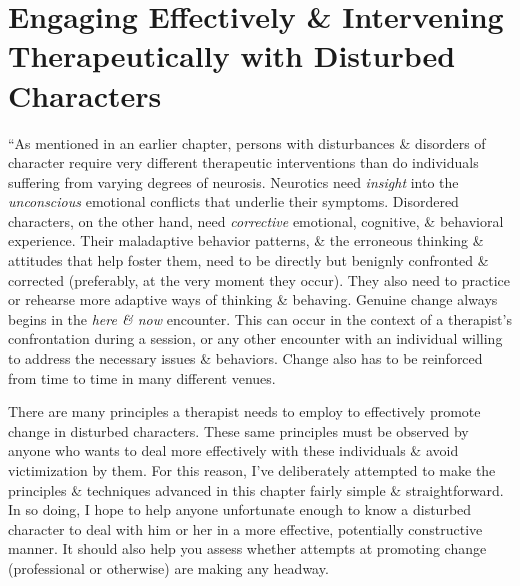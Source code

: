 \documentclass{article}
\numberwithin{equation}{section}
\begin{document}
\section{Engaging Effectively \& Intervening Therapeutically with Disturbed Characters}
``As mentioned in an earlier chapter, persons with disturbances \& disorders of character require very different therapeutic interventions than do individuals suffering from varying degrees of neurosis. Neurotics need \textit{insight} into the \textit{unconscious} emotional conflicts that underlie their symptoms. Disordered characters, on the other hand, need \textit{corrective} emotional, cognitive, \& behavioral experience. Their maladaptive behavior patterns, \& the erroneous thinking \& attitudes that help foster them, need to be directly but benignly confronted \& corrected (preferably, at the very moment they occur). They also need to practice or rehearse more adaptive ways of thinking \& behaving. Genuine change always begins in the \textit{here \& now} encounter. This can occur in the context of a therapist's confrontation during a session, or any other encounter with an individual willing to address the necessary issues \& behaviors. Change also has to be reinforced from time to time in many different venues.

There are many principles a therapist needs to employ to effectively promote change in disturbed characters. These same principles must be observed by anyone who wants to deal more effectively with these individuals \& avoid victimization by them. For this reason, I've deliberately attempted to make the principles \& techniques advanced in this chapter fairly simple \& straightforward. In so doing, I hope to help anyone unfortunate enough to know a disturbed character to deal with him or her in a more effective, potentially constructive manner. It should also help you assess whether attempts at promoting change (professional or otherwise) are making any headway.
\end{document}
